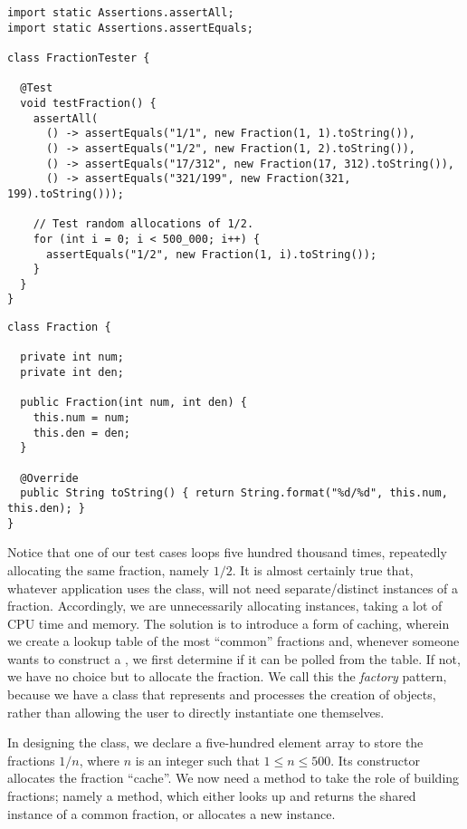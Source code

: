 \begin{cl}{}
\begin{lstlisting}[language=MyJava]
import static Assertions.assertAll;
import static Assertions.assertEquals;

class FractionTester {

  @Test
  void testFraction() {
    assertAll(
      () -> assertEquals("1/1", new Fraction(1, 1).toString()),
      () -> assertEquals("1/2", new Fraction(1, 2).toString()),
      () -> assertEquals("17/312", new Fraction(17, 312).toString()),
      () -> assertEquals("321/199", new Fraction(321, 199).toString()));

    // Test random allocations of 1/2.
    for (int i = 0; i < 500_000; i++) {
      assertEquals("1/2", new Fraction(1, i).toString());
    }
  } 
}
\end{lstlisting}
\end{cl}

\begin{cl}{}
\begin{lstlisting}[language=MyJava]
class Fraction {

  private int num;
  private int den;

  public Fraction(int num, int den) {
    this.num = num;
    this.den = den;
  }

  @Override
  public String toString() { return String.format("%d/%d", this.num, this.den); }
}
\end{lstlisting}
\end{cl}

Notice that one of our test cases loops five hundred thousand times, repeatedly allocating the same fraction, namely $1/2$. It is almost certainly true that, whatever application uses the  class, will not need separate/distinct instances of a fraction. Accordingly, we are unnecessarily allocating  instances, taking a lot of CPU time and memory. The solution is to introduce a form of caching, wherein we create a lookup table of the most ``common'' fractions and, whenever someone wants to construct a , we first determine if it can be polled from the table. If not, we have no choice but to allocate the fraction. We call this the \textit{factory} pattern, because we have a class that represents and processes the creation of  objects, rather than allowing the user to directly instantiate one themselves. 

In designing the  class, we declare a five-hundred element array to store the fractions $1/n$, where $n$ is an integer such that $1 \leq n \leq 500$. Its constructor allocates the fraction ``cache''. We now need a method to take the role of building fractions; namely a  method, which either looks up and returns the shared instance of a common fraction, or allocates a new instance.

